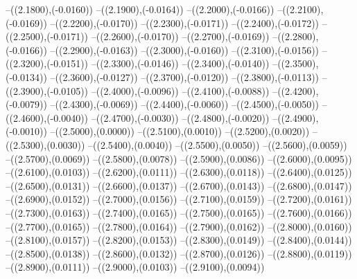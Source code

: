 {	--({\sx*(2.1800)},{\sy*(-0.0160)})
	--({\sx*(2.1900)},{\sy*(-0.0164)})
	--({\sx*(2.2000)},{\sy*(-0.0166)})
	--({\sx*(2.2100)},{\sy*(-0.0169)})
	--({\sx*(2.2200)},{\sy*(-0.0170)})
	--({\sx*(2.2300)},{\sy*(-0.0171)})
	--({\sx*(2.2400)},{\sy*(-0.0172)})
	--({\sx*(2.2500)},{\sy*(-0.0171)})
	--({\sx*(2.2600)},{\sy*(-0.0170)})
	--({\sx*(2.2700)},{\sy*(-0.0169)})
	--({\sx*(2.2800)},{\sy*(-0.0166)})
	--({\sx*(2.2900)},{\sy*(-0.0163)})
	--({\sx*(2.3000)},{\sy*(-0.0160)})
	--({\sx*(2.3100)},{\sy*(-0.0156)})
	--({\sx*(2.3200)},{\sy*(-0.0151)})
	--({\sx*(2.3300)},{\sy*(-0.0146)})
	--({\sx*(2.3400)},{\sy*(-0.0140)})
	--({\sx*(2.3500)},{\sy*(-0.0134)})
	--({\sx*(2.3600)},{\sy*(-0.0127)})
	--({\sx*(2.3700)},{\sy*(-0.0120)})
	--({\sx*(2.3800)},{\sy*(-0.0113)})
	--({\sx*(2.3900)},{\sy*(-0.0105)})
	--({\sx*(2.4000)},{\sy*(-0.0096)})
	--({\sx*(2.4100)},{\sy*(-0.0088)})
	--({\sx*(2.4200)},{\sy*(-0.0079)})
	--({\sx*(2.4300)},{\sy*(-0.0069)})
	--({\sx*(2.4400)},{\sy*(-0.0060)})
	--({\sx*(2.4500)},{\sy*(-0.0050)})
	--({\sx*(2.4600)},{\sy*(-0.0040)})
	--({\sx*(2.4700)},{\sy*(-0.0030)})
	--({\sx*(2.4800)},{\sy*(-0.0020)})
	--({\sx*(2.4900)},{\sy*(-0.0010)})
	--({\sx*(2.5000)},{\sy*(0.0000)})
	--({\sx*(2.5100)},{\sy*(0.0010)})
	--({\sx*(2.5200)},{\sy*(0.0020)})
	--({\sx*(2.5300)},{\sy*(0.0030)})
	--({\sx*(2.5400)},{\sy*(0.0040)})
	--({\sx*(2.5500)},{\sy*(0.0050)})
	--({\sx*(2.5600)},{\sy*(0.0059)})
	--({\sx*(2.5700)},{\sy*(0.0069)})
	--({\sx*(2.5800)},{\sy*(0.0078)})
	--({\sx*(2.5900)},{\sy*(0.0086)})
	--({\sx*(2.6000)},{\sy*(0.0095)})
	--({\sx*(2.6100)},{\sy*(0.0103)})
	--({\sx*(2.6200)},{\sy*(0.0111)})
	--({\sx*(2.6300)},{\sy*(0.0118)})
	--({\sx*(2.6400)},{\sy*(0.0125)})
	--({\sx*(2.6500)},{\sy*(0.0131)})
	--({\sx*(2.6600)},{\sy*(0.0137)})
	--({\sx*(2.6700)},{\sy*(0.0143)})
	--({\sx*(2.6800)},{\sy*(0.0147)})
	--({\sx*(2.6900)},{\sy*(0.0152)})
	--({\sx*(2.7000)},{\sy*(0.0156)})
	--({\sx*(2.7100)},{\sy*(0.0159)})
	--({\sx*(2.7200)},{\sy*(0.0161)})
	--({\sx*(2.7300)},{\sy*(0.0163)})
	--({\sx*(2.7400)},{\sy*(0.0165)})
	--({\sx*(2.7500)},{\sy*(0.0165)})
	--({\sx*(2.7600)},{\sy*(0.0166)})
	--({\sx*(2.7700)},{\sy*(0.0165)})
	--({\sx*(2.7800)},{\sy*(0.0164)})
	--({\sx*(2.7900)},{\sy*(0.0162)})
	--({\sx*(2.8000)},{\sy*(0.0160)})
	--({\sx*(2.8100)},{\sy*(0.0157)})
	--({\sx*(2.8200)},{\sy*(0.0153)})
	--({\sx*(2.8300)},{\sy*(0.0149)})
	--({\sx*(2.8400)},{\sy*(0.0144)})
	--({\sx*(2.8500)},{\sy*(0.0138)})
	--({\sx*(2.8600)},{\sy*(0.0132)})
	--({\sx*(2.8700)},{\sy*(0.0126)})
	--({\sx*(2.8800)},{\sy*(0.0119)})
	--({\sx*(2.8900)},{\sy*(0.0111)})
	--({\sx*(2.9000)},{\sy*(0.0103)})
	--({\sx*(2.9100)},{\sy*(0.0094)})
}
